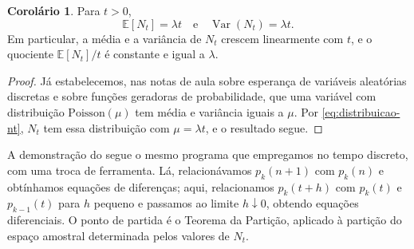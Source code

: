 \documentclass[12pt,portuguese]{article}
\theoremstyle{definition}
\newtheorem{corollary}[corollary]{Corolário}
\theoremstyle{plainexercise}
\theoremstyle{starredexercise}
\theoremstyle{definition}
\begin{document}
\begin{corollary}\label{cor:media-variancia-nt}
Para $t>0$,
\begin{equation}\label{eq:media-variancia-nt}
  \mathbb{E}[N_t]=\lambda t
  \quad\text{e}\quad
  \operatorname{Var}(N_t)=\lambda t.
\end{equation}
Em particular, a média e a variância de $N_t$ crescem linearmente com $t$, e o
quociente $\mathbb{E}[N_t]/t$ é constante e igual a $\lambda$.
\end{corollary}
\begin{proof}
Já estabelecemos, nas notas de aula sobre esperança de variáveis aleatórias
discretas e sobre funções geradoras de probabilidade, que uma variável com
distribuição $\mathrm{Poisson}(\mu)$ tem média e variância iguais a $\mu$. Por
\eqref{eq:distribuicao-nt}, $N_t$ tem essa distribuição com $\mu=\lambda t$, e
o resultado segue.
\end{proof}

A demonstração do  segue o mesmo programa que
empregamos no tempo discreto, com uma troca de ferramenta. Lá, relacionávamos
$p_k(n+1)$ com $p_k(n)$ e obtínhamos equações de diferenças; aqui,
relacionamos $p_k(t+h)$ com $p_k(t)$ e $p_{k-1}(t)$ para $h$ pequeno e
passamos ao limite $h\downarrow0$, obtendo equações diferenciais. O ponto de
partida é o Teorema da Partição, aplicado à partição do espaço amostral
determinada pelos valores de $N_t$.
\end{document}
